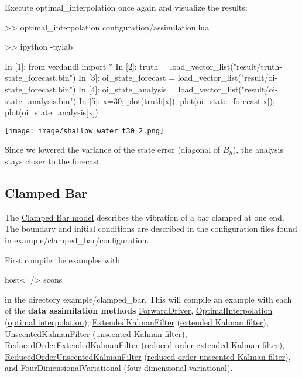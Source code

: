 \documentclass{tufte-book}
\begin{document}
\-Execute optimal\-\_\-interpolation once again and visualize the results\-:

\begin{frame_python}
>> optimal_interpolation configuration/assimilation.lua

>> ipython -pylab

In  [1]: from verdandi import *
In  [2]: truth = load_vector_list("result/truth-state_forecast.bin")
In  [3]: oi_state_forecast = load_vector_list("result/oi-state_forecast.bin")
In  [4]: oi_state_analysis = load_vector_list("result/oi-state_analysis.bin")
In  [5]: x=30; plot(truth[x]); plot(oi_state_forecast[x]); plot(oi_state_analysis[x])
\end{frame_python}

\texttt{[image: image/shallow\_water\_t30\_2.png]}


\-Since we lowered the variance of the state error (diagonal of $B_h$), the analysis stays closer to the forecast.

\hypertarget{example_programs_clamped_bar}{}\subsection{\-Clamped Bar}\label{example_programs_clamped_bar}

\-The \hyperlink{clamped_bar}{\-Clamped \-Bar model} describes the vibration of a bar clamped at one end. \-The boundary and initial conditions are described in the configuration files found in {\ttfamily example/clamped\-\_\-bar/configuration}.

\-First compile the examples with
\begin{frame_bash}
host<~/> scons
\end{frame_bash}
  in the directory {\ttfamily example/clamped\-\_\-bar}. \-This will compile an example with each of the {\bfseries data assimilation methods} {\ttfamily  \hyperlink{class_verdandi_1_1_forward_driver}{\-Forward\-Driver}}, {\ttfamily  \hyperlink{class_verdandi_1_1_optimal_interpolation}{\-Optimal\-Interpolation}} (\hyperlink{optimal_interpolation}{optimal interpolation}), {\ttfamily  \hyperlink{class_verdandi_1_1_extended_kalman_filter}{\-Extended\-Kalman\-Filter}} (\hyperlink{extended_kalman_filter}{extended \-Kalman filter}), {\ttfamily  \hyperlink{class_verdandi_1_1_unscented_kalman_filter}{\-Unscented\-Kalman\-Filter}} (\hyperlink{unscented_kalman_filter}{unscented \-Kalman filter}), {\ttfamily  \hyperlink{class_verdandi_1_1_reduced_order_extended_kalman_filter}{\-Reduced\-Order\-Extended\-Kalman\-Filter}} (\hyperlink{reduced_order_extended_kalman_filter}{reduced order extended \-Kalman filter}), {\ttfamily  \hyperlink{class_verdandi_1_1_reduced_order_unscented_kalman_filter}{\-Reduced\-Order\-Unscented\-Kalman\-Filter}} (\hyperlink{reduced_order_unscented_kalman_filter}{reduced order unscented \-Kalman filter}), and {\ttfamily  \hyperlink{class_verdandi_1_1_four_dimensional_variational}{\-Four\-Dimensional\-Variational}} (\hyperlink{four_dimensional_variational}{four dimensional variational}).
\end{document}
